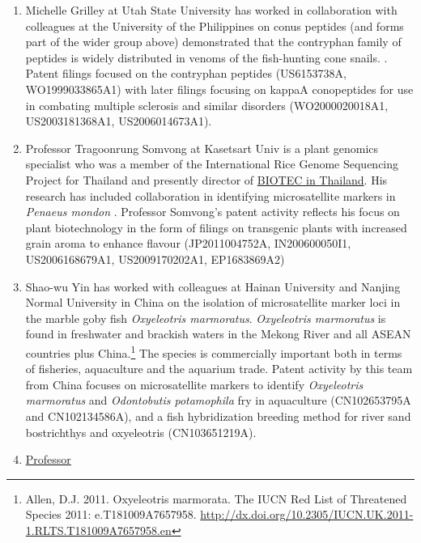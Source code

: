 \documentclass[]{book}
\theoremstyle{definition}
\theoremstyle{definition}
\theoremstyle{definition}
\theoremstyle{remark}
\begin{document}
\begin{enumerate}
\def\labelenumi{\arabic{enumi}.}
\setcounter{enumi}{7}
\item
  Michelle Grilley at Utah State University has worked in collaboration
  with colleagues at the University of the Philippines on conus peptides
  (and forms part of the wider group above) demonstrated that the
  contryphan family of peptides is widely distributed in venoms of the
  fish-hunting cone snails. \citep[originally published
  1998]{JACOBSEN_2009}. Patent filings focused on the contryphan
  peptides (US6153738A, WO1999033865A1) with later filings focusing on
  kappaA conopeptides for use in combating multiple sclerosis and
  similar disorders (WO2000020018A1, US2003181368A1, US2006014673A1).
\item
  Professor Tragoonrung Somvong at Kasetsart Univ is a plant genomics
  specialist who was a member of the International Rice Genome
  Sequencing Project for Thailand and presently director of
  \href{http://www.biotec.or.th/en/index.php/about-us/management-team}{BIOTEC
  in Thailand}. His research has included collaboration in identifying
  microsatellite markers in \emph{Penaeus mondon}
  \citep{Wuthisuthimethavee_2003}. Professor Somvong's patent activity
  reflects his focus on plant biotechnology in the form of filings on
  transgenic plants with increased grain aroma to enhance flavour
  (JP2011004752A, IN200600050I1, US2006168679A1, US2009170202A1,
  EP1683869A2)
\item
  Shao-wu Yin has worked with colleagues at Hainan University and
  Nanjing Normal University in China on the isolation of microsatellite
  marker loci in the marble goby fish \emph{Oxyeleotris marmoratus}.
  \emph{Oxyeleotris marmoratus} is found in freshwater and brackish
  waters in the Mekong River and all ASEAN countries plus
  China.\footnote{Allen, D.J. 2011. Oxyeleotris marmorata. The IUCN Red
    List of Threatened Species 2011: e.T181009A7657958.
    \url{http://dx.doi.org/10.2305/IUCN.UK.2011-1.RLTS.T181009A7657958.en}}
  The species is commercially important both in terms of fisheries,
  aquaculture and the aquarium trade. Patent activity by this team from
  China focuses on microsatellite markers to identify \emph{Oxyeleotris
  marmoratus} and \emph{Odontobutis potamophila} fry in aquaculture
  (CN102653795A and CN102134586A), and a fish hybridization breeding
  method for river sand bostrichthys and oxyeleotris (CN103651219A).
\item
  \href{https://www.researchgate.net/profile/Mahiran_Basri}{Professor
}
\end{enumerate}
\end{document}
